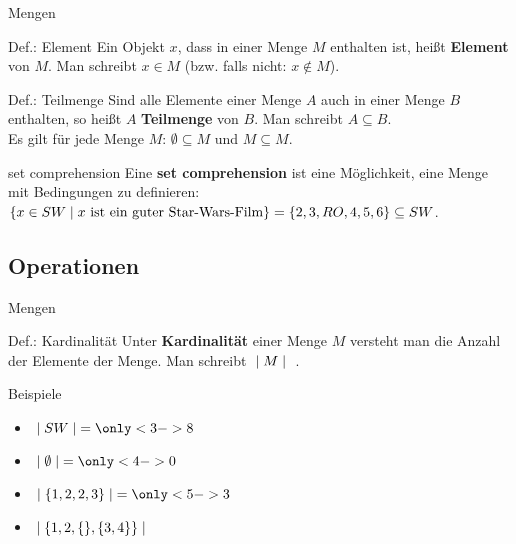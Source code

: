 	\begin{frame}{Mengen}
		\begin{block}{Def.: Element}
			Ein Objekt $x$, dass in einer Menge $M$ enthalten ist, heißt \textbf{Element} von $M$. Man schreibt $x \in M$ (bzw. falls nicht: $x \notin M$).			
		\end{block}

		\begin{block}{Def.: Teilmenge}
			Sind alle Elemente einer Menge $A$ auch in einer Menge $B$ enthalten, so heißt $A$ \textbf{Teilmenge} von $B$. Man schreibt $A \subseteq B$.\\
			Es gilt für jede Menge $M$: $\emptyset \subseteq M$ und $M \subseteq M$.
		\end{block}
		\pause
		\begin{block}{set comprehension}
			Eine \textbf{set comprehension} ist eine Möglichkeit, eine Menge mit Bedingungen zu definieren:\\
			$\{ x \in SW \mid x \text{ ist ein guter Star-Wars-Film} \} = \{ 2,3,RO,4,5,6 \} \subseteq SW$.
		\end{block}
	\end{frame}

\subsection{Operationen}
	\begin{frame}{Mengen}
		\begin{block}{Def.: Kardinalität}
			Unter \textbf{Kardinalität} einer Menge $M$ versteht man die Anzahl der Elemente der Menge. Man schreibt $\; \mid M \mid \;$ .
		\end{block}
		\pause
		\begin{exampleblock}{Beispiele}
			\begin{itemize}
				\item $\setsize{SW} = \only<3->{8}$
				\item $\setsize{\emptyset} = \only<4->{0}$
				\item $\setsize{\{1,2,2,3\}} = \only<5->{3}$
				\item $\; \mid \{ 1, 2, \{  \}, \{ 3,4 \} \} \mid \;$
			\end{itemize}
		\end{exampleblock}
	\end{frame}

